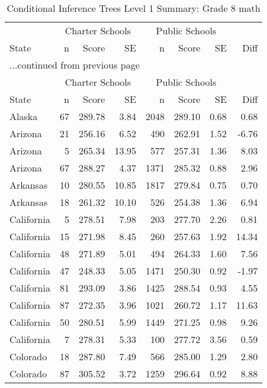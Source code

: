 \begin{longtable}{lrrr@{\extracolsep{10pt}}rrrr}
\caption{Conditional Inference Trees Level 1 Summary: Grade 8 math} \\ 
  \hline
  & \multicolumn{3}{c}{Charter Schools} & \multicolumn{3}{c}{Public Schools} & \\ \cline{2-4} \cline{5-7} State & n & Score & SE & n & Score & SE & Diff \\ \endfirsthead \multicolumn{8}{l}{{...continued from previous page}}\\ \hline & \multicolumn{3}{c}{Charter Schools} & \multicolumn{3}{c}{Public Schools} & \\ \cline{2-4} \cline{5-7} State & n & Score & SE & n & Score & SE & Diff \\ \hline \endhead \hline \endfoot \endlastfoot \hline
Alaska &  67 & 289.78 & 3.84 & 2048 & 289.10 & 0.68 & 0.68 \\ 
  Arizona &  21 & 256.16 & 6.52 & 490 & 262.91 & 1.52 & -6.76 \\ 
  Arizona &   5 & 265.34 & 13.95 & 577 & 257.31 & 1.36 & 8.03 \\ 
  Arizona &  67 & 288.27 & 4.37 & 1371 & 285.32 & 0.88 & 2.96 \\ 
  Arkansas &  10 & 280.55 & 10.85 & 1817 & 279.84 & 0.75 & 0.70 \\ 
  Arkansas &  18 & 261.32 & 10.10 & 526 & 254.38 & 1.36 & 6.94 \\ 
  California &   5 & 278.51 & 7.98 & 203 & 277.70 & 2.26 & 0.81 \\ 
  California &  15 & 271.98 & 8.45 & 260 & 257.63 & 1.92 & 14.34 \\ 
  California &  48 & 271.89 & 5.01 & 494 & 264.33 & 1.60 & 7.56 \\ 
  California &  47 & 248.33 & 5.05 & 1471 & 250.30 & 0.92 & -1.97 \\ 
  California &  81 & 293.09 & 3.86 & 1425 & 288.54 & 0.93 & 4.55 \\ 
  California &  87 & 272.35 & 3.96 & 1021 & 260.72 & 1.17 & 11.63 \\ 
  California &  50 & 280.51 & 5.99 & 1449 & 271.25 & 0.98 & 9.26 \\ 
  California &   7 & 278.31 & 5.33 & 100 & 277.72 & 3.56 & 0.59 \\ 
  Colorado &  18 & 287.80 & 7.49 & 566 & 285.00 & 1.29 & 2.80 \\ 
  Colorado &  87 & 305.52 & 3.72 & 1259 & 296.64 & 0.92 & 8.88 \\ 

\end{longtable}
